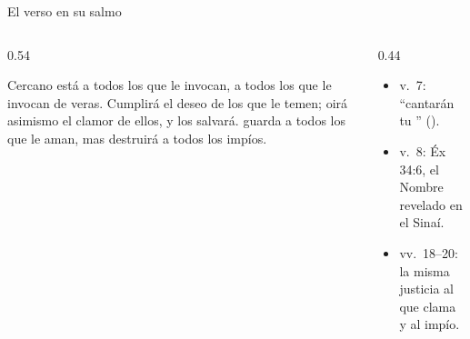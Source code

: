 \begin{frame}{El verso en su salmo}
\begin{columns}[c,onlytextwidth]
\begin{column}{0.54\textwidth}
\begin{cita}Cercano está \SENOR{} a todos los que le invocan, a todos los que le invocan de veras. Cumplirá el deseo de los que le temen; oirá asimismo el clamor de ellos, y los salvará. \SENOR{} guarda a todos los que le aman, mas destruirá a todos los impíos.\end{cita}
\end{column}
\begin{column}{0.44\textwidth}\small
\begin{itemize}
\item v.~7: ``cantarán tu '' ().
\item v.~8: Éx 34:6, el Nombre revelado en el Sinaí.
\item vv.~18--20: la misma justicia  al que clama y  al impío.
\end{itemize}
\end{column}
\end{columns}\par\medskip
{}
\end{frame}

